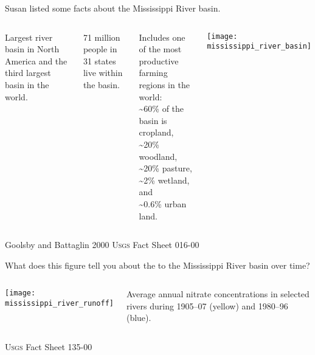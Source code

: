 \documentclass[t]{beamer}
\begin{document}
\begin{frame}{Susan listed some facts about the Mississippi River basin.}
	\vspace*{-\baselineskip}
	\begin{columns}[t]
	
		
			Largest river basin in North America and the third largest basin in the world. 
			
			\vspace*{1\baselineskip}
			
			71 million people in 31 states live within the basin.
			
			\vspace*{1\baselineskip}
			
			Includes one of the most productive farming regions in the world:\\
				\hspace*{1em}\textasciitilde60\% of the basin is cropland,\\
				\hspace*{1em}\textasciitilde20\% woodland,\\
				\hspace*{1em}\textasciitilde20\% pasture,\\
				\hspace*{1em}\textasciitilde2\% wetland, and\\
				\hspace*{1em}\textasciitilde0.6\% urban land.
															
		
			\texttt{[image: mississippi\_river\_basin]}
			 
	\end{columns}
	
	\vfilll
	
	\tiny Goolsby and Battaglin 2000 \hfill \textsc{Usgs} Fact Sheet 016-00
	
\end{frame}
%
\begin{frame}{What does this figure tell you about the  to the Mississippi River basin over time?}
	\vspace*{-\baselineskip}
	\begin{columns}[t]

		\column{0.6\textwidth}

			\texttt{[image: mississippi\_river\_runoff]}

		\column{0.3\textwidth}
		
			Average annual nitrate concentrations in selected rivers during 1905–07 (yellow) and 1980–96 (blue).
			
	\end{columns}
	\vfilll
	\hfill \tiny \textsc{Usgs} Fact Sheet 135-00
\end{frame}
\end{document}
